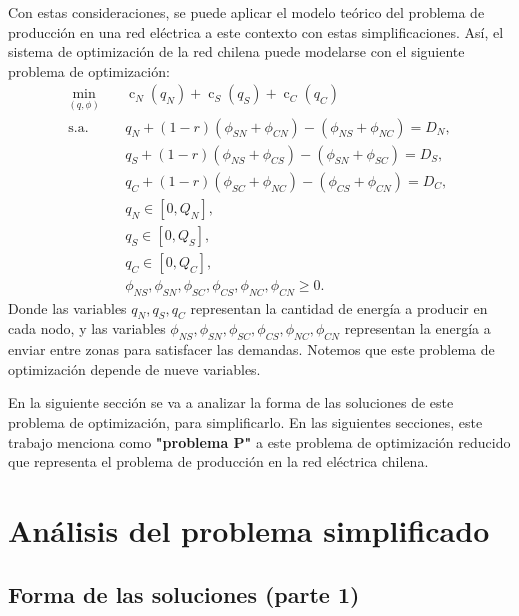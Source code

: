 \documentclass[12pt,twoside]{article}
\begin{document}
	\hspace{1cm} Con estas consideraciones, se puede aplicar el modelo te\'orico del problema de producci\'on en una red el\'ectrica a este contexto con estas simplificaciones. As\'i, el sistema de optimizaci\'on de la red chilena puede modelarse con el siguiente problema de optimizaci\'on:
	\begin{equation*}\begin{aligned}
				\min_{(q,\phi)} \quad & \operatorname{c}_N(q_N)+\operatorname{c}_S(q_S)+\operatorname{c}_C(q_C) \\
				\textrm{s.a.} \quad & q_N+(1-r)(\phi_{SN}+\phi_{CN})-(\phi_{NS}+\phi_{NC})=D_N, \\
				\quad & q_S+(1-r)(\phi_{NS}+\phi_{CS})-(\phi_{SN}+\phi_{SC})=D_S, \\
				\quad & q_C+(1-r)(\phi_{SC}+\phi_{NC})-(\phi_{CS}+\phi_{CN})=D_C, \\
				& q_N\in[0,Q_N], \\
				& q_S\in[0,Q_S], \\
				& q_C\in[0,Q_C], \\
				& \phi_{NS},\phi_{SN},\phi_{SC},\phi_{CS},\phi_{NC},\phi_{CN}\geq0.
		\end{aligned}\end{equation*}
	\hspace{1cm} Donde las variables \(q_N,q_S,q_C\) representan la cantidad de energ\'ia a producir en cada nodo, y las variables \(\phi_{NS},\phi_{SN},\phi_{SC},\phi_{CS},\phi_{NC},\phi_{CN}\) representan la energ\'ia a enviar entre zonas para satisfacer las demandas. Notemos que este problema de optimizaci\'on depende de nueve variables.
	
	\hspace{1cm} En la siguiente secci\'on se va a analizar la forma de las soluciones de este problema de optimizaci\'on, para simplificarlo. En las siguientes secciones, este trabajo menciona como \textbf{"problema P"} a este problema de optimizaci\'on reducido que representa el problema de producci\'on en la red el\'ectrica chilena.
	
	\newpage
	
	\section{An\'alisis del problema simplificado}
	\subsection{Forma de las soluciones (parte 1)}
	
\end{document}
